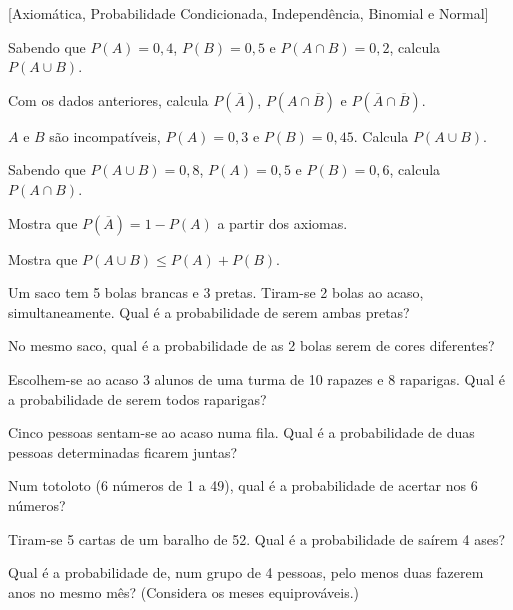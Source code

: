 \documentclass[12pt]{article}
\begin{document}
[Axiomática, Probabilidade Condicionada, Independência, Binomial e Normal]


\begin{exercicios}
  \item Sabendo que $P(A) = 0{,}4$, $P(B) = 0{,}5$ e $P(A \cap B) = 0{,}2$, calcula $P(A \cup B)$.
  \item Com os dados anteriores, calcula $P(\overline{A})$, $P(A \cap \overline{B})$ e $P(\overline{A} \cap \overline{B})$.
  \item $A$ e $B$ são incompatíveis, $P(A) = 0{,}3$ e $P(B) = 0{,}45$. Calcula $P(A \cup B)$.
  \item Sabendo que $P(A \cup B) = 0{,}8$, $P(A) = 0{,}5$ e $P(B) = 0{,}6$, calcula $P(A \cap B)$.
  \item Mostra que $P(\overline{A}) = 1 - P(A)$ a partir dos axiomas.
  \item Mostra que $P(A \cup B) \le P(A) + P(B)$.
\end{exercicios}

\begin{exercicios}
  \item Um saco tem 5 bolas brancas e 3 pretas. Tiram-se 2 bolas ao acaso, simultaneamente. Qual é a probabilidade de serem ambas pretas?
  \item No mesmo saco, qual é a probabilidade de as 2 bolas serem de cores diferentes?
  \item Escolhem-se ao acaso 3 alunos de uma turma de 10 rapazes e 8 raparigas. Qual é a probabilidade de serem todos raparigas?
  \item Cinco pessoas sentam-se ao acaso numa fila. Qual é a probabilidade de duas pessoas determinadas ficarem juntas?
  \item Num totoloto (6 números de 1 a 49), qual é a probabilidade de acertar nos 6 números?
  \item Tiram-se 5 cartas de um baralho de 52. Qual é a probabilidade de saírem 4 ases?
  \item Qual é a probabilidade de, num grupo de 4 pessoas, pelo menos duas fazerem anos no mesmo mês? (Considera os meses equiprováveis.)
\end{exercicios}
\end{document}
